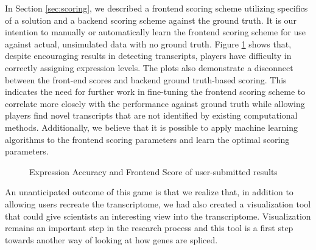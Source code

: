 \documentclass[12pt]{article}
\begin{document}
In Section \ref{sec:scoring}, we described a frontend scoring scheme utilizing specifics of a solution and a backend scoring scheme against the ground truth. It is our intention to manually or automatically learn the frontend scoring scheme for use against actual, unsimulated data with no ground truth. Figure \ref{fig:score} shows that, despite encouraging results in detecting transcripts, players have difficulty in correctly assigning expression levels. The plots also demonstrate a disconnect between the front-end scores and backend ground truth-based scoring. This indicates the need for further work in fine-tuning the frontend scoring scheme to correlate more closely with the performance against ground truth while allowing players find novel transcripts that are not
identified by existing computational methods. Additionally, we believe that it is possible to apply machine learning algorithms to the frontend scoring parameters and learn the optimal scoring parameters.

\begin{figure}[H]
\centering
{}
\caption{Expression Accuracy and Frontend Score of user-submitted results}\label{fig:score}
\end{figure}

An unanticipated outcome of this game is that we realize that, in addition to allowing users recreate the transcriptome, we had also created a visualization tool that could give scientists an interesting view into the transcriptome. Visualization remains an important step in the research process and this tool is a first step towards another way of looking at how genes are spliced.
\end{document}
